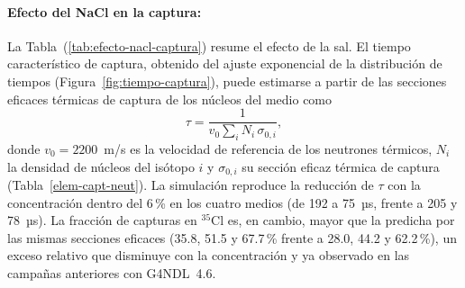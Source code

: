 \paragraph{Efecto del NaCl en la captura:} La Tabla~(\ref{tab:efecto-nacl-captura}) resume el efecto de la sal. El tiempo característico de captura, obtenido del ajuste exponencial de la distribución de tiempos (Figura~\ref{fig:tiempo-captura}), puede estimarse a partir de las secciones eficaces térmicas de captura de los núcleos del medio como
\begin{equation}
	\tau = \frac{1}{v_{0}\sum_{i} N_{i}\,\sigma_{0,i}},
	\label{eq:tau-captura}
\end{equation}
donde $v_{0}=2200$~m/s es la velocidad de referencia de los neutrones térmicos, $N_{i}$ la densidad de núcleos del isótopo $i$ y $\sigma_{0,i}$ su sección eficaz térmica de captura (Tabla~\ref{elem-capt-neut}). La simulación reproduce la reducción de $\tau$ con la concentración dentro del 6\,\% en los cuatro medios (de 192 a 75~µs, frente a 205 y 78~µs). La fracción de capturas en $^{35}$Cl es, en cambio, mayor que la predicha por las mismas secciones eficaces (35.8, 51.5 y 67.7\,\% frente a 28.0, 44.2 y 62.2\,\%), un exceso relativo que disminuye con la concentración y ya observado en las campañas anteriores con G4NDL~4.6.

